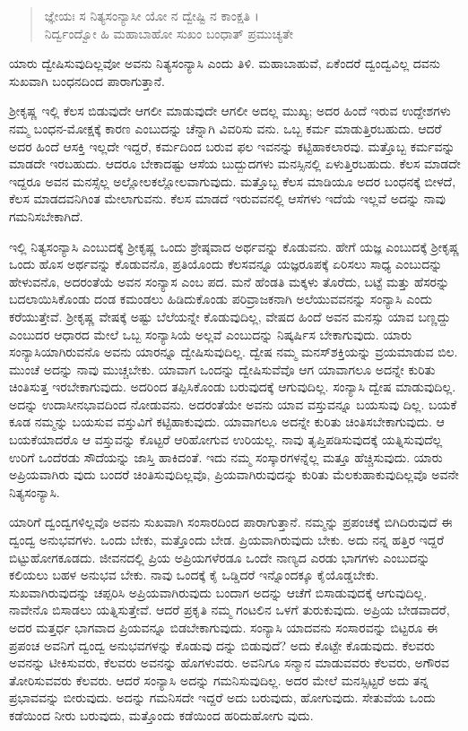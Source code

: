 \begin{verse}
ಜ್ಞೇಯಃ ಸ ನಿತ್ಯಸಂನ್ಯಾಸೀ ಯೋ ನ ದ್ವೇಷ್ಟಿ ನ ಕಾಂಕ್ಷತಿ ।\\ನಿರ್ದ್ವಂದ್ವೋ ಹಿ ಮಹಾಬಾಹೋ ಸುಖಂ ಬಂಧಾತ್ ಪ್ರಮುಚ್ಯತೇ 
\end{verse}

{\small ಯಾರು ದ್ವೇಷಿಸುವುದಿಲ್ಲವೋ ಅವನು ನಿತ್ಯಸಂನ್ಯಾಸಿ ಎಂದು ತಿಳಿ. ಮಹಾಬಾಹುವೆ, ಏಕೆಂದರೆ ದ್ವಂದ್ವವಿಲ್ಲ ದವನು ಸುಖವಾಗಿ ಬಂಧನದಿಂದ ಪಾರಾಗುತ್ತಾನೆ.}

ಶ್ರೀಕೃಷ್ಣ ಇಲ್ಲಿ ಕೆಲಸ ಬಿಡುವುದೇ ಆಗಲೀ ಮಾಡುವುದೇ ಆಗಲೀ ಅದಲ್ಲ ಮುಖ್ಯ; ಅದರ ಹಿಂದೆ ಇರುವ ಉದ್ದೇಶಗಳು ನಮ್ಮ ಬಂಧನ-ಮೋಕ್ಷಕ್ಕೆ ಕಾರಣ ಎಂಬುದನ್ನು ಚೆನ್ನಾಗಿ ವಿವರಿಸು ವನು. ಒಬ್ಬ ಕರ್ಮ ಮಾಡುತ್ತಿರಬಹುದು. ಆದರೆ ಅದರ ಹಿಂದೆ ಆಸಕ್ತಿ ಇಲ್ಲದೇ ಇದ್ದರೆ, ಕರ್ಮದಿಂದ ಬರುವ ಫಲ ಇವನನ್ನು ಕಟ್ಟಿಹಾಕಲಾರವು. ಮತ್ತೊಬ್ಬ ಕರ್ಮವನ್ನು ಮಾಡದೇ ಇರಬಹುದು. ಆದರೂ ಬೇಕಾದಷ್ಟು ಆಸೆಯ ಬುದ್ಬುದಗಳು ಮನಸ್ಸಿನಲ್ಲಿ ಏಳುತ್ತಿರಬಹುದು. ಕೆಲಸ ಮಾಡದೇ ಇದ್ದರೂ ಅವನ ಮನಸ್ಸೆಲ್ಲ ಅಲ್ಲೋಲಕಲ್ಲೋಲವಾಗುವುದು. ಮತ್ತೊಬ್ಬ ಕೆಲಸ ಮಾಡಿಯೂ ಅದರ ಬಂಧನಕ್ಕೆ ಬೀಳದೆ, ಕೆಲಸ ಮಾಡದವನಿಗಿಂತ ಮೇಲಾಗುವನು. ಕೆಲಸ ಮಾಡದೆ ಇರುವವನಲ್ಲಿ ಆಸೆಗಳು ಇದೆಯೆ ಇಲ್ಲವೆ ಅದನ್ನು ನಾವು ಗಮನಿಸಬೇಕಾಗಿದೆ.

ಇಲ್ಲಿ ನಿತ್ಯಸಂನ್ಯಾಸಿ ಎಂಬುದಕ್ಕೆ ಶ್ರೀಕೃಷ್ಣ ಒಂದು ಶ್ರೇಷ್ಠವಾದ ಅರ್ಥವನ್ನು ಕೊಡುವನು. ಹೇಗೆ ಯಜ್ಞ ಎಂಬುದಕ್ಕೆ ಶ್ರೀಕೃಷ್ಣ ಒಂದು ಹೊಸ ಅರ್ಥವನ್ನು ಕೊಡುವನೊ, ಪ್ರತಿಯೊಂದು ಕೆಲಸವನ್ನೂ ಯಜ್ಞರೂಪಕ್ಕೆ ಏರಿಸಲು ಸಾಧ್ಯ ಎಂಬುದನ್ನು ಹೇಳುವನೊ, ಅದರಂತೆಯೆ ಅವನ ಸಂನ್ಯಾಸ ಎಂಬ ಪದ. ಮನೆ ಹೆಂಡತಿ ಮಕ್ಕಳು ತೊರೆದು, ಬಟ್ಟೆ ಮತ್ತು ಹೆಸರನ್ನು ಬದಲಾಯಿಸಿಕೊಂಡು ದಂಡ ಕಮಂಡಲು ಹಿಡಿದುಕೊಂಡು ಪರಿವ್ರಾಜಕನಾಗಿ ಅಲೆಯುವವನನ್ನು ಸಂನ್ಯಾಸಿ ಎಂದು ಕರೆಯುತ್ತೇವೆ. ಶ್ರೀಕೃಷ್ಣ ವೇಷಕ್ಕೆ ಅಷ್ಟು ಬೆಲೆಯನ್ನೇ ಕೊಡುವುದಿಲ್ಲ, ವೇಷದ ಹಿಂದೆ ಅವನ ಮನಸ್ಸು ಯಾವ ಬಣ್ಣದ್ದು ಎಂಬುದರ ಆಧಾರದ ಮೇಲೆ ಒಬ್ಬ ಸಂನ್ಯಾಸಿಯೆ ಅಲ್ಲವೆ ಎಂಬುದನ್ನು ನಿಷ್ಕರ್ಷಿಸ ಬೇಕಾಗುವುದು. ಯಾರು ಸಂನ್ಯಾಸಿಯಾಗಿರುವನೊ ಅವನು ಯಾರನ್ನೂ ದ್ವೇಷಿಸುವುದಿಲ್ಲ. ದ್ವೇಷ ನಮ್ಮ ಮನಸ್​ಶಕ್ತಿಯನ್ನು ವ್ರಯಮಾಡುವ ಬಿಲ. ಮುಂಚೆ ಅದನ್ನು ನಾವು ಮುಚ್ಚಬೇಕು. ಯಾವಾಗ ಒಂದನ್ನು ದ್ವೇಷಿಸುವೆವೊ ಆಗ ಯಾವಾಗಲೂ ಅದನ್ನೇ ಕುರಿತು ಚಿಂತಿಸುತ್ತ ಇರಬೇಕಾಗುವುದು. ಅದರಿಂದ ತಪ್ಪಿಸಿಕೊಂಡು ಬರುವುದಕ್ಕೆ ಆಗುವುದಿಲ್ಲ. ಸಂನ್ಯಾಸಿ ದ್ವೇಷ ಮಾಡುವುದಿಲ್ಲ. ಅದನ್ನು ಉದಾಸೀನಭಾವದಿಂದ ನೋಡುವನು. ಅದರಂತೆಯೇ ಅವನು ಯಾವ ವಸ್ತುವನ್ನೂ ಬಯಸುವು ದಿಲ್ಲ. ಬಯಕೆ ಕೂಡ ನಮ್ಮನ್ನು ಬಯಸುವ ವಸ್ತುವಿಗೆ ಕಟ್ಟಿಹಾಕುವುದು. ಯಾವಾಗಲೂ ಅದನ್ನೇ ಕುರಿತು ಚಿಂತಿಸಬೇಕಾಗುವುದು. ಆ ಬಯಕೆಯಾದರೊ ಆ ವಸ್ತುವನ್ನು ಕೊಟ್ಟರೆ ಆರಿಹೋಗುವ ಉರಿಯಲ್ಲ. ನಾವು ತೃಪ್ತಿಪಡಿಸುವುದಕ್ಕೆ ಯತ್ನಿಸುವುದೆಲ್ಲ ಉರಿಗೆ ಒಂದೆರಡು ಸೌದೆಯನ್ನು ಜಾಸ್ತಿ ಹಾಕಿದಂತೆ. ಇದು ನಮ್ಮ ಸಂಸ್ಕಾರಗಳನ್ನೆಲ್ಲ ಮತ್ತೂ ಹೆಚ್ಚಿಸುವುದು. ಯಾರು ಅಪ್ರಿಯವಾಗಿರು ವುದು ಬಂದರೆ ಚಿಂತಿಸುವುದಿಲ್ಲವೊ, ಪ್ರಿಯವಾಗಿರುವುದನ್ನು ಕುರಿತು ಮೆಲಕುಹಾಕುವುದಿಲ್ಲವೊ ಅವನೇ ನಿತ್ಯಸಂನ್ಯಾಸಿ.

ಯಾರಿಗೆ ದ್ವಂದ್ವಗಳಿಲ್ಲವೊ ಅವನು ಸುಖವಾಗಿ ಸಂಸಾರದಿಂದ ಪಾರಾಗುತ್ತಾನೆ. ನಮ್ಮನ್ನು ಪ್ರಪಂಚಕ್ಕೆ ಬಿಗಿದಿರುವುದೆ ಈ ದ್ವಂದ್ವ ಅನುಭವಗಳು. ಒಂದು ಬೇಕು, ಮತ್ತೊಂದು ಬೇಡ. ಪ್ರಿಯವಾಗಿರುವುದು ಬೇಕು. ಅದು ನನ್ನ ಹತ್ತಿರ ಇದ್ದರೆ ಬಿಟ್ಟುಹೋಗಕೂಡದು. ಜೀವನದಲ್ಲಿ ಪ್ರಿಯ ಅಪ್ರಿಯಗಳೆರಡೂ ಒಂದೇ ನಾಣ್ಯದ ಎರಡು ಭಾಗಗಳು ಎಂಬುದನ್ನು ಕಲಿಯಲು ಬಹಳ ಅನುಭವ ಬೇಕು. ನಾವು ಒಂದಕ್ಕೆ ಕೈ ಒಡ್ಡಿದರೆ ಇನ್ನೊಂದಕ್ಕೂ ಕೈಯೊಡ್ಡಬೇಕು. ಸುಖವಾಗಿರುವುದನ್ನು ಚಪ್ಪರಿಸಿ ಅಪ್ರಿಯವಾಗಿರುವುದು ಬಂದಾಗ ಅದನ್ನು ಆಚೆಗೆ ಬಿಸಾಡುವುದಕ್ಕೆ ಆಗುವುದಿಲ್ಲ. ನಾವೇನೊ ಬಿಸಾಡಲು ಯತ್ನಿಸುತ್ತೇವೆ. ಆದರೆ ಪ್ರಕೃತಿ ನಮ್ಮ ಗಂಟಲಿನ ಒಳಗೆ ತುರುಕುವುದು. ಅಪ್ರಿಯ ಬೇಡವಾದರೆ, ಅದರ ಮತ್ತರ್ಧ ಭಾಗವಾದ ಪ್ರಿಯವನ್ನೂ ಬಿಡಬೇಕಾಗುವುದು. ಸಂನ್ಯಾಸಿ ಯಾದವನು ಸಂಸಾರವನ್ನು ಬಿಟ್ಟರೂ ಈ ಪ್ರಪಂಚ ಅವನಿಗೆ ದ್ವಂದ್ವ ಅನುಭವಗಳನ್ನು ಕೊಡುವು ದನ್ನು ಬಿಡುವುದೆ? ಅದು ಕೊಟ್ಟೇ ಕೊಡುವುದು. ಕೆಲವರು ಅವನನ್ನು ಟೀಕಿಸುವರು, ಕೆಲವರು ಅವನನ್ನು ಹೊಗಳುವರು. ಅವನಿಗೂ ಸನ್ಮಾನ ಮಾಡುವವರು ಕೆಲವರು, ಅಗೌರವ ತೋರಿಸುವವರು ಕೆಲವರು. ಆದರೆ ಸಂನ್ಯಾಸಿ ಅದನ್ನು ಗಮನಿಸುವುದಿಲ್ಲ. ಅದರ ಮೇಲೆ ಮನಸ್ಸಿಟ್ಟರೆ ಅದು ತನ್ನ ಪ್ರಭಾವವನ್ನು ಬೀರುವುದು. ಅದನ್ನು ಗಮನಿಸದೇ ಇದ್ದರೆ ಅದು ಬರುವುದು, ಹೋಗುವುದು. ಸೇತುವೆಯ ಒಂದು ಕಡೆಯಿಂದ ನೀರು ಬರುವುದು, ಮತ್ತೊಂದು ಕಡೆಯಿಂದ ಹರಿದುಹೋಗು ವುದು.

